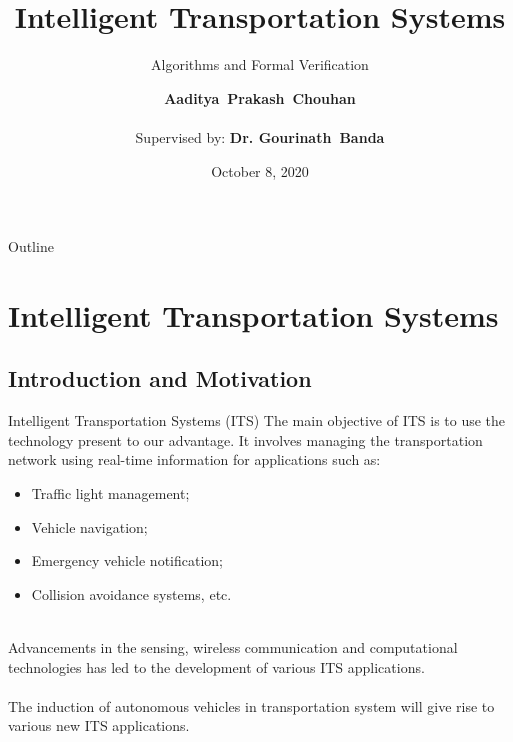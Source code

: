 \documentclass{beamer}
\title[Open Seminar]{Intelligent Transportation Systems }
\subtitle{Algorithms and Formal Verification}
\author[A.P. Chouhan]{\textbf{Aaditya~Prakash~Chouhan}\\~\\ Supervised by: \textbf{Dr. Gourinath~Banda}}
\institute[IIT Indore] %
{
Discipline of Computer Science and Engineering\\	
\textbf{Indian Institute of Technology Indore}\\~\\
\textit{phd1501201006@iiti.ac.in}

}
\date[October 8, 2020]{October 8, 2020}
\begin{document}
\begin{frame}
  \titlepage
\end{frame}

\begin{frame}{Outline}
  \tableofcontents
\end{frame}


\section{Intelligent Transportation Systems}
\subsection{Introduction and Motivation}
\begin{frame}{Intelligent Transportation Systems (ITS)}
The main objective of ITS is to use the technology present to our advantage. It involves managing the transportation network using real-time information for applications such as:
\begin{itemize}
	\item Traffic light management;
	\item Vehicle navigation;
	\item Emergency vehicle notification;
	\item Collision avoidance systems, etc.\\~\\
\end{itemize}
Advancements in the sensing, wireless communication and computational technologies has led to the development of various ITS applications.\\~\\
The induction of autonomous vehicles in transportation system will give rise to various new ITS applications.

\end{frame}

%	
\end{document}
